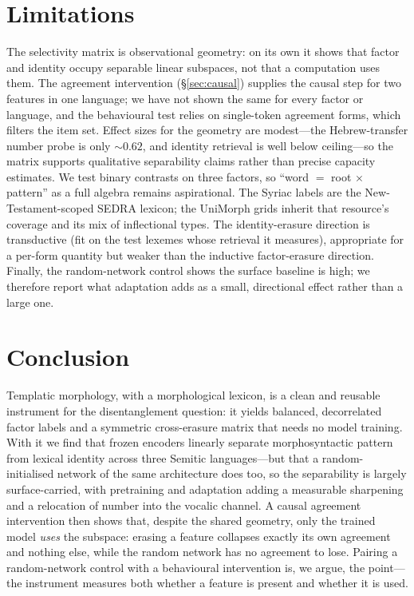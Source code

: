 \documentclass[11pt]{article}
\begin{document}
\section{Limitations}
\label{sec:limitations}

The selectivity matrix is observational geometry: on its own it shows that factor
and identity occupy separable linear subspaces, not that a computation uses them.
The agreement intervention (\S\ref{sec:causal}) supplies the causal step for two
features in one language; we have not shown the same for every factor or language,
and the behavioural test relies on single-token agreement forms, which filters the
item set. Effect sizes for the geometry are modest---the Hebrew-transfer number
probe is only $\sim$$0.62$, and identity retrieval is well below ceiling---so the
matrix supports qualitative separability claims rather than precise capacity
estimates. We test binary contrasts on three factors, so ``word $=$ root $\times$
pattern'' as a full algebra remains aspirational. The Syriac labels are the
New-Testament-scoped SEDRA lexicon; the UniMorph grids inherit that resource's
coverage and its mix of inflectional types. The identity-erasure direction is
transductive (fit on the test lexemes whose retrieval it measures), appropriate for
a per-form quantity but weaker than the inductive factor-erasure direction. Finally,
the random-network control shows the surface baseline is high; we therefore report
what adaptation adds as a
small, directional effect rather than a large one.

\section{Conclusion}
\label{sec:conclusion}

Templatic morphology, with a morphological lexicon, is a clean and reusable
instrument for the disentanglement question: it yields balanced, decorrelated factor
labels and a symmetric cross-erasure matrix that needs no model training. With it we
find that frozen encoders linearly separate morphosyntactic pattern from lexical
identity across three Semitic languages---but that a random-initialised network of
the same architecture does too, so the separability is largely surface-carried, with
pretraining and adaptation adding a measurable sharpening and a relocation of number
into the vocalic channel. A causal agreement intervention then shows that, despite
the shared geometry, only the trained model \emph{uses} the subspace: erasing a
feature collapses exactly its own agreement and nothing else, while the random
network has no agreement to lose. Pairing a random-network control with a behavioural
intervention is, we argue, the point---the instrument measures both whether a feature
is present and whether it is used.
\end{document}
